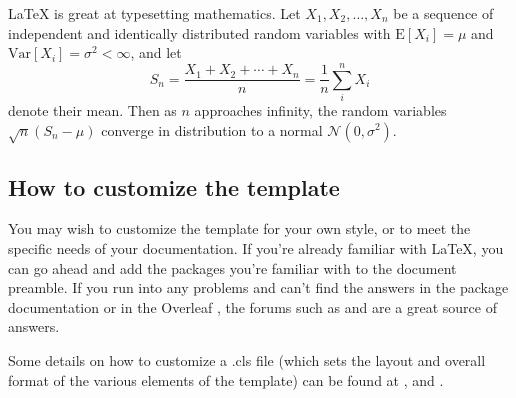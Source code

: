 \LaTeX{} is great at typesetting mathematics. Let $X_1, X_2, \ldots, X_n$ be a sequence of independent and identically distributed random variables with $\text{E}[X_i] = \mu$ and $\text{Var}[X_i] = \sigma^2 < \infty$, and let
\[S_n = \frac{X_1 + X_2 + \cdots + X_n}{n}
= \frac{1}{n}\sum_{i}^{n} X_i\]
denote their mean. Then as $n$ approaches infinity, the random variables $\sqrt{n}(S_n - \mu)$ converge in distribution to a normal $\mathcal{N}(0, \sigma^2)$.

\subsection{How to customize the template}

You may wish to customize the template for your own style, or to meet the specific needs of your documentation. If you're already familiar with LaTeX,  you can go ahead and add the packages you're familiar with to the document preamble. If you run into any problems and can't find the answers in the package documentation or in the Overleaf , the forums such as  and  are a great source of answers.

Some details on how to customize a .cls file (which sets the layout and overall format of the various elements of the template) can be found at , and .